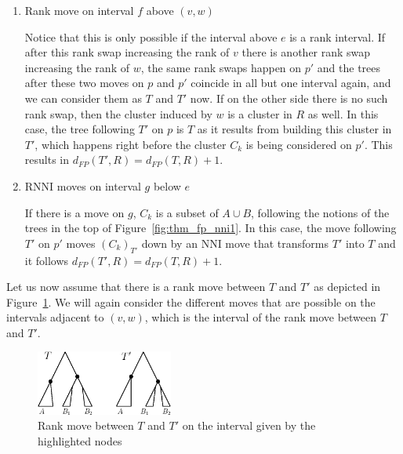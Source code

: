\documentclass{amsart}
\newcommand{\rnni}{\mathrm{RNNI}}
\newcommand{\nni}{\mathrm{NNI}}
\begin{document}
\begin{enumerate}
    \item Rank move on interval $f$ above $(v,w)$

    Notice that this is only possible if the interval above $e$ is a rank interval.
    If after this rank swap increasing the rank of $v$ there is another rank swap increasing the rank of $w$, the same rank swaps happen on $p'$ and the trees after these two moves on $p$ and $p'$ coincide in all but one interval again, and we can consider them as $T$ and $T'$ now.
    If on the other side there is no such rank swap, then the cluster induced by $w$ is a cluster in $R$ as well.
    In this case, the tree following $T'$ on $p$ is $T$ as it results from building this cluster in $T'$, which happens right before the cluster $C_k$ is being considered on $p'$.
    This results in $d_{FP}(T',R) = d_{FP}(T,R) + 1$.

    \item $\rnni$ moves on interval $g$ below $e$

    If there is a move on $g$, $C_k$ is a subset of $A \cup B$, following the notions of the trees in the top of Figure~\ref{fig:thm_fp_nni1}.
    In this case, the move following $T'$ on $p'$ moves $(C_k)_{T'}$ down by an $\nni$ move that transforms $T'$ into $T$ and it follows $d_{FP}(T',R) = d_{FP}(T,R) + 1$.

\end{enumerate}

Let us now assume that there is a rank move between $T$ and $T'$ as depicted in Figure~\ref{fig:thm_fp_rank1}.
We will again consider the different moves that are possible on the intervals adjacent to $(v,w)$, which is the interval of the rank move between $T$ and $T'$.


\begin{figure}[!hbt]
\centering
\includegraphics[width=0.4\textwidth]{thm_fp_rank1}
\vspace{12pt}
\caption{Rank move between $T$ and $T'$ on the interval given by the highlighted nodes}
\label{fig:thm_fp_rank1}
\end{figure}
\end{document}
